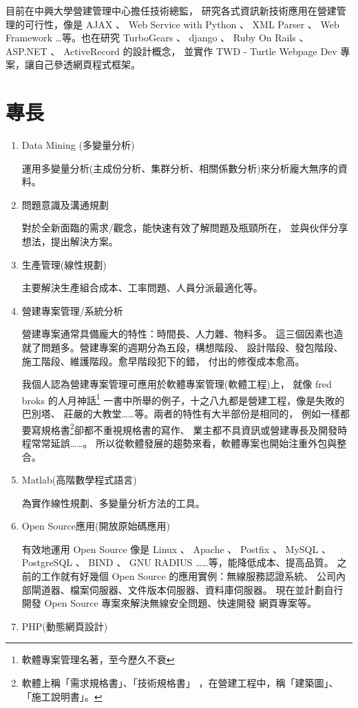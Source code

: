 \documentclass[12pt,a4paper]{article}
\begin{document}
\begin{CJK}{UTF8}{bsmi}
    目前在中興大學營建管理中心擔任技術總監，%
    研究各式資訊新技術應用在營建管理的可行性，像是 AJAX 、 Web Service with Python 、%
    XML Parser 、 Web Framework …等。也在研究 TurboGears 、 django 、%
    Ruby On Rails 、 ASP.NET 、 ActiveRecord 的設計概念，%
    並實作 TWD - Turtle Webpage Dev 專案，讓自己參透網頁程式框架。%
    \section{專長}
    \begin{enumerate}
        \item Data Mining (多變量分析)

        運用多變量分析(主成份分析、集群分析、相關係數分析)來分析龐大無序的資料。
        \item 問題意識及溝通規劃

        對於全新面臨的需求/觀念，能快速有效了解問題及瓶頸所在，%
        並與伙伴分享想法，提出解決方案。
        \item 生產管理(線性規劃)

        主要解決生產組合成本、工率問題、人員分派最適化等。
        \item 營建專案管理/系統分析
        
        營建專案通常具備龐大的特性：時間長、人力雜、物料多。%
        這三個因素也造就了問題多。營建專案的週期分為五段，構想階段、%
        設計階段、發包階段、施工階段、維護階段。愈早階段犯下的錯，%
        付出的修復成本愈高。

        我個人認為營建專案管理可應用於軟體專案管理(軟體工程)上，%
        就像 fred broks 的人月神話\footnote{軟體專案管理名著，至今歷久不衰}%
        一書中所舉的例子，十之八九都是營建工程，像是失敗的巴別塔、%
        莊嚴的大教堂……等。兩者的特性有大半部份是相同的，%
        例如一樣都要寫規格書\footnote{軟體上稱「需求規格書」、「技術規格書」%
        ，在營建工程中，稱「建築圖」、「施工說明書」。}卻都不重視規格書的寫作、%
        業主都不具資訊或營建專長及開發時程常常延誤……。%
        所以從軟體發展的趨勢來看，軟體專案也開始注重外包與整合。
        \item Matlab(高階數學程式語言)

        為實作線性規劃、多變量分析方法的工具。
        \item Open Source應用(開放原始碼應用)

        有效地運用 Open Source 像是 Linux 、 Apache 、 Postfix 、 MySQL 、%
        PostgreSQL 、 BIND 、 GNU RADIUS ……等，能降低成本、提高品質。%
        之前的工作就有好幾個 Open Source 的應用實例：無線服務認證系統、%
        公司內部閘道器、檔案伺服器、文件版本伺服器、資料庫伺服器。%
        現在並計劃自行開發 Open Source 專案來解決無線安全問題、快速開發%
        網頁專案等。
        \item PHP(動態網頁設計)


\end{enumerate}
\end{CJK}
\end{document}
